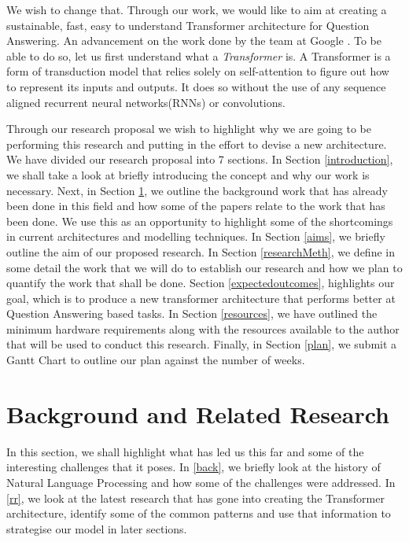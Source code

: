 \documentclass[11pt]{article}
\begin{document}
	We wish to change that. Through our work, we would like to aim at creating a sustainable, fast, easy to understand Transformer architecture for Question Answering. An advancement on the work done by the team at Google \citep{atayl}. To be able to do so, let us first understand what a \textit{Transformer} is.
    A Transformer is a form of transduction model that relies solely on self-attention to figure out how to represent its inputs and outputs. It does so without the use of any sequence aligned recurrent neural networks(RNNs) or convolutions.

    Through our research proposal we wish to highlight why we are going to be performing this research and putting in the effort to devise a new architecture. We have divided our research proposal into 7 sections. In Section \ref{introduction}, we shall take a look at briefly introducing the concept and why our work is necessary. Next, in Section \ref{backRR}, we outline the background work that has already been done in this field and how some of the papers relate to the work that has been done. We use this as an opportunity to highlight some of the shortcomings in current architectures and modelling techniques. In Section \ref{aims}, we briefly outline the aim of our proposed research. In Section \ref{researchMeth}, we define in some detail the work that we will do to establish our research and how we plan to quantify the work that shall be done. Section \ref{expectedoutcomes}, highlights our goal, which is to produce a new transformer architecture that performs better at Question Answering based tasks.
	In Section \ref{resources}, we have outlined the minimum hardware requirements along with the resources available to the author that will be used to conduct this research. Finally, in Section \ref{plan}, we submit a Gantt Chart to outline our plan against the number of weeks.

	\section{Background and Related Research}\label{backRR}
	In this section, we shall highlight what has led us this far and some of the interesting challenges that it poses. In \ref{back}, we briefly look at the history of Natural Language Processing and how some of the challenges were addressed. In \ref{rr}, we look at the latest research that has gone into creating the Transformer architecture, identify some of the common patterns and use that information to strategise our model in later sections.
\end{document}
